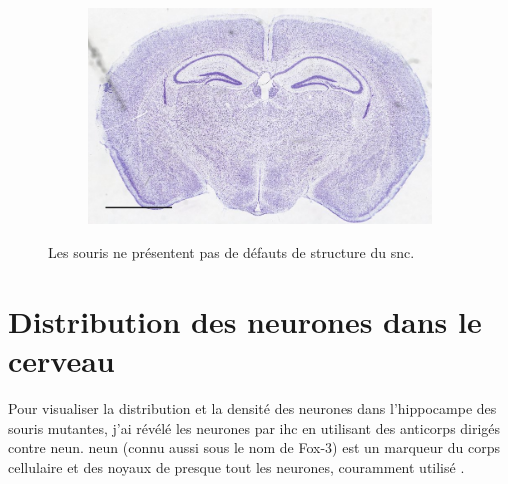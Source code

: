 \begin{figure}[h]
\begin{center}
\begin{subfigure}[h]{0.49\textwidth}
			\end{subfigure}
			\begin{subfigure}[h]{0.49\textwidth}%
				\caption{}
				\label{fig:MaleMutNissl}
				\includegraphics[width=\textwidth]{./Images/Nissl/MaleMut.jpg}
			\end{subfigure}
		\end{center}
		\caption{Les souris \mcrd ne présentent pas de défauts de structure du \acrshort{snc}.}
		\label{fig:NisslResultat}
	\end{figure}
	\FloatBarrier

\section{Distribution des neurones dans le cerveau}
	\label{sec:neun}
	Pour visualiser la distribution et la densité des neurones dans l'hippocampe des souris mutantes, j'ai révélé les neurones par \acrshort{ihc} en utilisant des anticorps dirigés contre \acrshort{neun}. \Acrshort{neun} (connu aussi sous le nom de Fox-3) est un marqueur du  corps cellulaire et des noyaux de presque tout les neurones, couramment utilisé \cite{Guselnikova2015, Kim2009}. 
	
